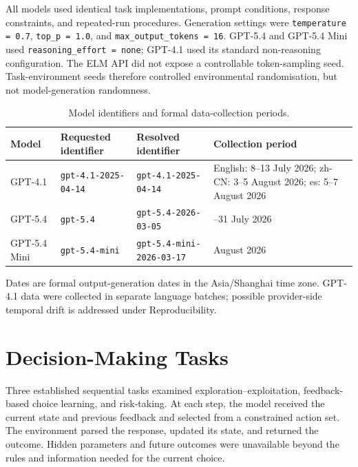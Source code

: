 \documentclass[logo,msc]{infthesis}
\begin{document}
All models used identical task implementations, prompt conditions, response constraints, and repeated-run procedures. Generation settings were \texttt{temperature = 0.7}, \texttt{top\_p = 1.0}, and \texttt{max\_output\_tokens = 16}. GPT-5.4 and GPT-5.4 Mini used \texttt{reasoning\_effort = none}; GPT-4.1 used its standard non-reasoning configuration. The ELM API did not expose a controllable token-sampling seed. Task-environment seeds therefore controlled environmental randomisation, but not model-generation randomness.

\begin{table}[htbp]
\centering
\caption{Model identifiers and formal data-collection periods.}
\label{tab:model_identifiers}
\begin{tabularx}{\textwidth}{@{}>{\raggedright\arraybackslash}p{2.1cm}>{\raggedright\arraybackslash}X>{\raggedright\arraybackslash}X>{\raggedright\arraybackslash}p{3.2cm}@{}}
\toprule
\textbf{Model} & \textbf{Requested identifier} & \textbf{Resolved identifier} & \textbf{Collection period} \\
\midrule
GPT-4.1 & \texttt{gpt-4.1-2025-04-14} & \texttt{gpt-4.1-2025-04-14} & English: 8--13 July 2026; zh-CN: 3--5 August 2026; es: 5--7 August 2026 \\
GPT-5.4 & \texttt{gpt-5.4} & \texttt{gpt-5.4-2026-03-05} & 30--31 July 2026 \\
GPT-5.4 Mini & \texttt{gpt-5.4-mini} & \texttt{gpt-5.4-mini-2026-03-17} & 1 August 2026 \\
\bottomrule
\end{tabularx}
\end{table}

Dates are formal output-generation dates in the Asia/Shanghai time zone. GPT-4.1 data were collected in separate language batches; possible provider-side temporal drift is addressed under Reproducibility.

\section{Decision-Making Tasks}

Three established sequential tasks examined exploration--exploitation, feedback-based choice learning, and risk-taking. At each step, the model received the current state and previous feedback and selected from a constrained action set. The environment parsed the response, updated its state, and returned the outcome. Hidden parameters and future outcomes were unavailable beyond the rules and information needed for the current choice.
\end{document}

